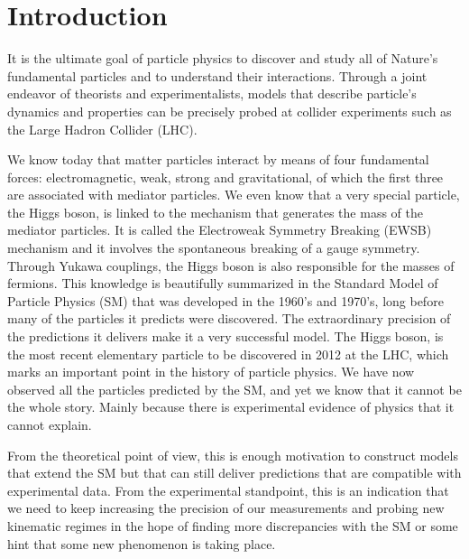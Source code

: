 
\chapter{Introduction}
\label{chapter:introduction}

It is the ultimate goal of particle physics to discover and study all of Nature's fundamental particles and to understand their interactions. Through a joint endeavor of theorists and experimentalists, models that describe particle's dynamics and properties can be precisely probed at collider experiments such as the Large Hadron Collider (LHC). 

We know today that matter particles interact by means of four fundamental forces: electromagnetic, weak, strong and gravitational, of which the first three are associated with mediator particles. We even know that a very special particle, the Higgs boson, is linked to the mechanism that generates the mass of the mediator particles. It is called the Electroweak Symmetry Breaking (EWSB) mechanism and it involves the spontaneous breaking of a gauge symmetry. Through Yukawa couplings, the Higgs boson is also responsible for the masses of fermions. This knowledge is beautifully summarized in the Standard Model of Particle Physics (SM) that was developed in the 1960's and 1970's, long before many of the particles it predicts were discovered. The extraordinary precision of the predictions it delivers make it a very successful model. The Higgs boson, is the most recent elementary particle to be discovered in 2012 at the LHC, which marks an important point in the history of particle physics. We have now observed all the particles predicted by the SM, and yet we know that it cannot be the whole story. Mainly because there is experimental evidence of physics that it cannot explain.

From the theoretical point of view, this is enough motivation to construct models that extend the SM but that can still deliver predictions that are compatible with experimental data. From the experimental standpoint, this is an indication that we need to keep increasing the precision of our measurements and probing new kinematic regimes in the hope of finding more discrepancies with the SM or some hint that some new phenomenon is taking place.

